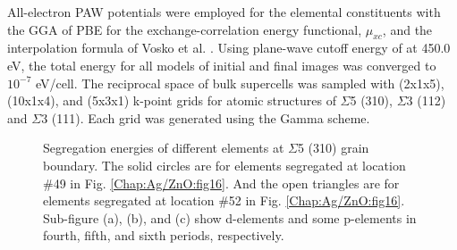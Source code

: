 All-electron \ac{PAW} potentials were employed for the elemental constituents with the \ac{GGA} of \ac{PBE} for the exchange-correlation energy functional, $\mu_{xc}$, and the interpolation formula of Vosko et al. \cite{vosko1980accurate}. Using plane-wave cutoff energy of at 450.0 eV, the total energy for all models of initial and final images was converged to $10^{−7}$ eV/cell. The reciprocal space of bulk supercells was sampled with (2x1x5), (10x1x4), and (5x3x1) k-point grids for atomic structures of $\Sigma$5 (310), $\Sigma$3 (112) and $\Sigma$3 (111). Each grid was generated using the Gamma scheme.


\begingroup
\begin{figure}[!ht]
  \centering
\caption[Segregation energies of different elements at $\Sigma$5 (310) grain boundary.]{Segregation energies of different elements at $\Sigma$5 (310) grain boundary. The solid circles are for elements segregated at location \#49 in Fig. \ref{Chap:Ag/ZnO:fig16}. And the open triangles are for elements segregated at location \#52 in Fig. \ref{Chap:Ag/ZnO:fig16}. Sub-figure (a), (b), and (c) show d-elements and some p-elements in fourth, fifth, and sixth periods, respectively.}
\label{Chap:Ag/ZnO:fig17}
\end{figure}
\endgroup


